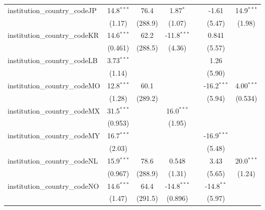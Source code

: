 \begin{tabular}{lcccccc}
   institution\_country\_codeJP          & 14.8$^{***}$  & 76.4         & 1.87$^{*}$    &               & -1.61         & 14.9$^{***}$\\   
                                         & (1.17)        & (288.9)      & (1.07)        &               & (5.47)        & (1.98)\\   
   institution\_country\_codeKR          & 14.6$^{***}$  & 62.2         & -11.8$^{***}$ &               & 0.841         &   \\   
                                         & (0.461)       & (288.5)      & (4.36)        &               & (5.57)        &   \\   
   institution\_country\_codeLB          & 3.73$^{***}$  &              &               &               & 1.26          &   \\   
                                         & (1.14)        &              &               &               & (5.90)        &   \\   
   institution\_country\_codeMO          & 12.8$^{***}$  & 60.1         &               &               & -16.2$^{***}$ & 4.00$^{***}$\\   
                                         & (1.28)        & (289.2)      &               &               & (5.94)        & (0.534)\\   
   institution\_country\_codeMX          & 31.5$^{***}$  &              & 16.0$^{***}$  &               &               &   \\   
                                         & (0.953)       &              & (1.95)        &               &               &   \\   
   institution\_country\_codeMY          & 16.7$^{***}$  &              &               &               & -16.9$^{***}$ &   \\   
                                         & (2.03)        &              &               &               & (5.48)        &   \\   
   institution\_country\_codeNL          & 15.9$^{***}$  & 78.6         & 0.548         &               & 3.43          & 20.0$^{***}$\\   
                                         & (0.967)       & (288.9)      & (1.31)        &               & (5.65)        & (1.24)\\   
   institution\_country\_codeNO          & 14.6$^{***}$  & 64.4         & -14.8$^{***}$ &               & -14.8$^{**}$  &   \\   
                                         & (1.47)        & (291.5)      & (0.896)       &               & (5.97)        &   \\   

\end{tabular}
